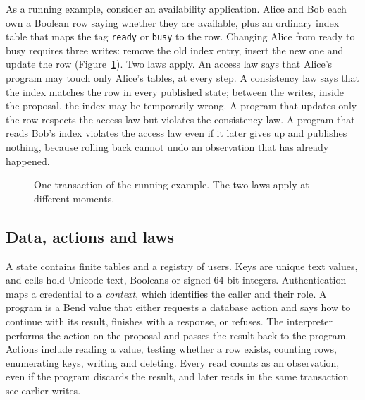 \documentclass[12pt]{article}
\newcommand{\code}[1]{\texttt{#1}}
\begin{document}
As a running example, consider an availability application. Alice and Bob each
own a Boolean row saying whether they are available, plus an ordinary index
table that maps the tag \code{ready} or \code{busy} to the row. Changing Alice
from ready to busy requires three writes: remove the old index entry, insert the
new one and update the row (Figure~\ref{fig:trace}). Two laws apply. An access
law says that Alice's program may touch only Alice's tables, at every step. A
consistency law says that the index matches the row in every published state;
between the writes, inside the proposal, the index may be temporarily wrong.
A program that updates only the row respects the access law but violates the
consistency law. A program that reads Bob's index violates the access law even
if it later gives up and publishes nothing, because rolling back cannot undo an
observation that has already happened.

\begin{figure}[H]\centering
{}
\caption{One transaction of the running example. The two laws apply at
different moments.}\label{fig:trace}
\end{figure}

\subsection{Data, actions and laws}
A state contains finite tables and a registry of users. Keys are unique text
values, and cells hold Unicode text, Booleans or signed 64-bit integers.
Authentication maps a credential to a \emph{context}, which identifies the
caller and their role. A program is a Bend value that either requests a
database action and says how to continue with its result, finishes with a
response, or refuses. The interpreter performs the action on the proposal and
passes the result back to the program. Actions include reading a value, testing
whether a row exists, counting rows, enumerating keys, writing and deleting.
Every read counts as an observation, even if the program discards the result,
and later reads in the same transaction see earlier writes.
\end{document}
